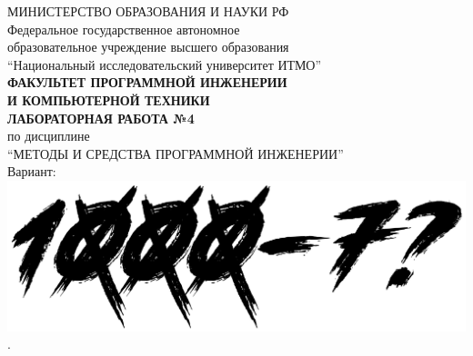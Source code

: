 \thispagestyle{empty}
\BgThispage
\begin{center}
	МИНИСТЕРСТВО ОБРАЗОВАНИЯ И НАУКИ РФ\\
	\hfill \break
	Федеральное государственное автономное\\
	образовательное учреждение высшего образования\\
	``Национальный исследовательский университет ИТМО''\\
	\hfill \break
	\textbf{ФАКУЛЬТЕТ ПРОГРАММНОЙ ИНЖЕНЕРИИ \\
	И КОМПЬЮТЕРНОЙ ТЕХНИКИ}\\
	\vspace{2cm}
	\large{\textbf{ЛАБОРАТОРНАЯ РАБОТА №4}}\\
	\hfill \break
	по дисциплине\\
		\large{``МЕТОДЫ И СРЕДСТВА ПРОГРАММНОЙ ИНЖЕНЕРИИ''}\\
	\hfill \break
	Вариант: \includegraphics[scale=0.03]{img/1000-7}. \\
\end{center}
